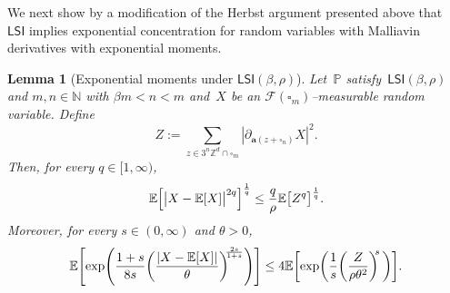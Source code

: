 \documentclass[11pt]{article} %
\let\oldsquare\square %
\renewcommand{\square}{\oldsquare}
\numberwithin{equation}{section}
\newtheorem{lemma}[theorem]{Lemma}
\theoremstyle{definition}
\let\originalleft\left
\let\originalright\right
\renewcommand{\left}{\mathopen{}\mathclose\bgroup\originalleft}
\renewcommand{\right}{\aftergroup\egroup\originalright}
\newcommand*{\N}{\ensuremath{\mathbb{N}}}
\newcommand*{\Zd}{\ensuremath{\mathbb{Z}^d}}
\renewcommand{\a}{\mathbf{a}}
\newcommand{\cu}{\square}
\newcommand{\F}{\mathcal{F}}
\renewcommand{\P}{\mathbb{P}}
\newcommand{\E}{\mathbb{E}}
\newcommand{\LSI}{\mathsf{LSI}}
\begin{document}
\smallskip 

We next show by a modification of the Herbst argument presented above that~$\LSI$ implies exponential concentration for random variables with Malliavin derivatives with exponential moments.

\begin{lemma}[Exponential moments under $\LSI(\beta,\rho)$]
\label{l.LSI.moments}
Let~$\P$ satisfy~$\LSI(\beta,\rho)$ and  $m,n\in\N$ with $\beta m < n < m$  and~$X$ be an $\F(\cu_m)$--measurable random variable. Define
\begin{equation}
\label{e.Zderv.again}
Z := \sum_{z\in3^n\Zd\cap \cu_m} |  \partial_{\a(z+\cu_n)} X|^2.
\end{equation}
Then, for every $q\in [1,\infty)$, 
\begin{align}
\label{e.LSI.momentbound}
\E \left[ \big| X - \E[X] \big|^{2q} \right]^{\frac1{q}}
\leq 
\frac{q}{\rho} \E \big[ Z^{q} \big]^{\frac1{q}}.
\end{align}
Moreover, for every $s\in (0,\infty)$ and $\theta>0$, 
\begin{align}
\label{e.LSI.expmoments}
\E \left[ \exp\left( \frac{1+s}{8s}\left( \frac{ \left| X - \E[X] \right|}{\theta} \right)^{\!\!\frac{2s}{1+s}} \right) \right]
\leq 
4
\E \left[ \exp\left( \frac1{s} \left( \frac{Z}{\rho\theta^2}  \right)^{\!\!s}\, \right) \right].
\end{align}
\end{lemma}
\end{document}
